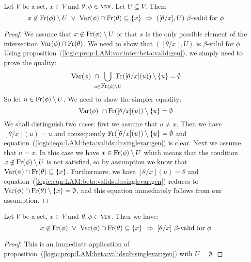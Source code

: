 \begin{prop}\label{logic:prop:LAM:beta:validsub:singlevar:gen}
    Let $V$ be a set, $x\in V$ and $\theta,\phi\in\tv$. Let $U\subseteq V$. Then:
        \[
            x\not\in\free(\phi)\setminus U
            \ \lor\
            \var(\phi)\cap\free(\theta)\subseteq\{x\}
            \ \Rightarrow\ 
            \mbox{$([\theta/x],U)$ $\beta$-valid for $\phi$}
        \]
\end{prop}
\begin{proof}
    We assume that $x\not\in\mbox{\rm Fr}(\phi)\setminus U$ or that $x$ is the only 
    possible element of the intersection $\mbox{\rm Var}(\phi)\cap\mbox{\rm Fr}(\theta)$. We 
    need to show that $([\theta/x],U)$ is $\beta$-valid for $\phi$. Using
    proposition~(\ref{logic:prop:LAM:var:inter:beta:valid:gen}), we simply
    need to prove the quality:
        \[
            \var(\phi)\ \cap
            \!\!\!\!\!\!\bigcup_{u\in\free(\phi)\setminus U}\!\!\!\!\!\!
            \free([\theta/x](u))\setminus\{u\}
            =\emptyset
        \]
    So let $u\in\mbox{\rm Fr}(\phi)\setminus U$. We need to show the simpler equality:
        \begin{equation}\label{logic:eqn:LAM:beta:validsub:singlevar:gen}
            \mbox{\rm Var}(\phi)\ \cap
            \mbox{\rm Fr}([\theta/x](u))\setminus\{u\}
            =\emptyset
        \end{equation}
    We shall distinguish two cases: first we assume that $u\neq x$. Then we have
    $[\theta/x](u)=u$ and consequently $\mbox{\rm Fr}([\theta/x](u))\setminus\{u\}
    =\emptyset$ and equation~(\ref{logic:eqn:LAM:beta:validsub:singlevar:gen})
    is clear. Next we assume that $u=x$. In this case we have $x\in\mbox{\rm Fr}(\phi)
    \setminus U$ which means that the condition $x\not\in\mbox{\rm Fr}(\phi)\setminus U$
    is not satisfied, so by assumption we know that $\mbox{\rm Var}(\phi)\cap\mbox{\rm Fr}(\theta)
    \subseteq\{x\}$. Furthermore, we have $[\theta/x](u)=\theta$ and
    equation~(\ref{logic:eqn:LAM:beta:validsub:singlevar:gen}) reduces to
    $\mbox{\rm Var}(\phi)\cap\mbox{\rm Fr}(\theta)\setminus\{x\}=\emptyset$, and this equation
    immediately follows from our assumption.
\end{proof}



\begin{prop}\label{logic:prop:LAM:beta:validsub:singlevar}
    Let $V$ be a set, $x\in V$ and $\theta,\phi\in\tv$. Then we have:
        \[
            x\not\in\free(\phi)
            \ \lor\
            \var(\phi)\cap\free(\theta)\subseteq\{x\}
            \ \Rightarrow\ 
            \mbox{$[\theta/x]$ $\beta$-valid for $\phi$}
        \]
\end{prop}
\begin{proof}
    This is an immediate application of 
    proposition~(\ref{logic:prop:LAM:beta:validsub:singlevar:gen}) with 
    $U=\emptyset$.
\end{proof}

